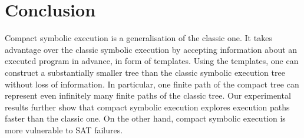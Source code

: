 \documentclass{sig-alternate}%
\begin{document}

\section{Conclusion}\label{sec:conclusion}

Compact symbolic execution is a generalisation of the classic one. It
takes advantage over the classic symbolic execution by accepting
information about an executed program in advance, in form of
templates.
Using the templates, one can construct a substantially smaller tree than
the classic symbolic execution tree without loss of information. In
particular, one finite path of the compact tree can represent even
infinitely many finite paths of the classic tree. Our experimental
results further show that compact symbolic execution explores
execution paths faster than the classic one. On the other hand,
compact symbolic execution is more vulnerable to SAT failures.

%



\end{document}
